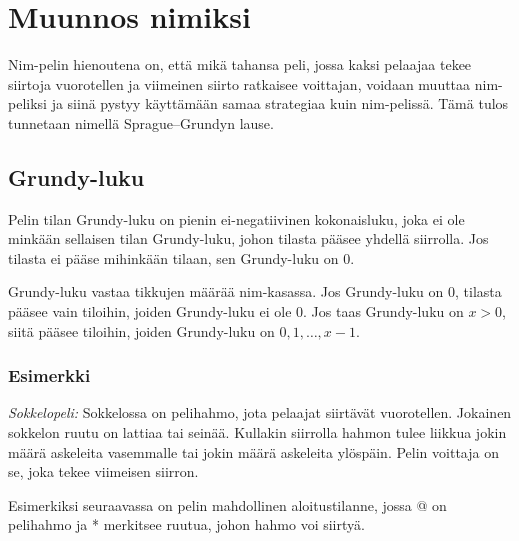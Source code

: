\section{Muunnos nimiksi}

Nim-pelin hienoutena on, että mikä tahansa peli,
jossa kaksi pelaajaa tekee siirtoja vuorotellen
ja viimeinen siirto ratkaisee voittajan,
voidaan muuttaa nim-peliksi
ja siinä pystyy käyttämään samaa strategiaa kuin nim-pelissä.
Tämä tulos tunnetaan nimellä Sprague–Grundyn lause.

\subsection{Grundy-luku}

Pelin tilan Grundy-luku on pienin ei-negatiivinen kokonaisluku,
joka ei ole minkään sellaisen tilan Grundy-luku,
johon tilasta pääsee yhdellä siirrolla.
Jos tilasta ei pääse mihinkään tilaan,
sen Grundy-luku on 0.

Grundy-luku vastaa tikkujen määrää nim-kasassa.
Jos Grundy-luku on 0, tilasta pääsee vain tiloihin,
joiden Grundy-luku ei ole 0.
Jos taas Grundy-luku on $x>0$, siitä pääsee tiloihin,
joiden Grundy-luku on $0,1,\ldots,x-1$.

\subsubsection*{Esimerkki}

\textit{Sokkelopeli:} Sokkelossa on pelihahmo,
jota pelaajat siirtävät vuorotellen.
Jokainen sokkelon ruutu on lattiaa tai seinää.
Kullakin siirrolla hahmon tulee liikkua jokin
määrä askeleita vasemmalle tai jokin
määrä askeleita ylöspäin.
Pelin voittaja on se, joka tekee viimeisen siirron.

Esimerkiksi seuraavassa on pelin mahdollinen aloitustilanne,
jossa @ on pelihahmo ja * merkitsee ruutua, johon hahmo voi siirtyä.

\begin{center}
\end{center}

